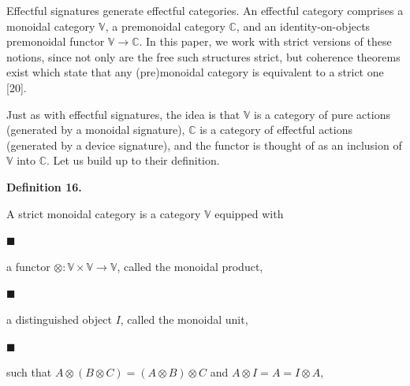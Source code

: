  
Effectful signatures generate effectful categories. An effectful category comprises a monoidal category $\mathbb{V}$, a premonoidal category $\mathbb{C}$, and an identity-on-objects premonoidal functor $\mathbb{V}\to\mathbb{C}$. In this paper, we work with strict versions of these notions, since not only are the free such structures strict, but coherence theorems exist which state that any (pre)monoidal category is equivalent to a strict one [20].\par
 
 
 
Just as with effectful signatures, the idea is that $\mathbb{V}$ is a category of pure actions (generated by a monoidal signature), $\mathbb{C}$ is a category of effectful actions (generated by a device signature), and the functor is thought of as an inclusion of $\mathbb{V}$ into $\mathbb{C}$. Let us build up to their definition.\par
 
 
 
\par\medskip\noindent\textbf{Definition 16.}\par
 
 
A strict monoidal category is a category $\mathbb{V}$ equipped with\par
  
\par\noindent  $\blacksquare$ 
 
a functor $\otimes:\mathbb{V}\times\mathbb{V}\to\mathbb{V}$, called the monoidal product,\par
 
 
 
\par\noindent  $\blacksquare$ 
 
a distinguished object $I$, called the monoidal unit,\par
 
 
 
\par\noindent  $\blacksquare$ 
 
such that $A\otimes(B\otimes C)=(A\otimes B)\otimes C$ and $A\otimes I=A=I\otimes A$,\par
 
